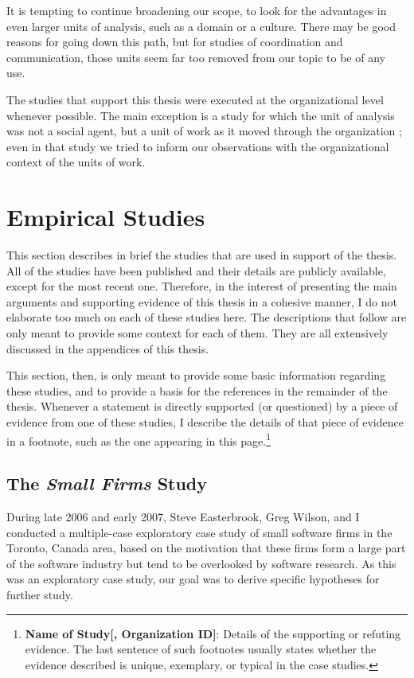 It is tempting to continue broadening our scope, to look for the advantages in even larger units of analysis, such as a domain or a culture. There may be good reasons for going down this path, but for studies of coordination and communication, those units seem far too removed from our topic to be of any use.

The studies that support this thesis were executed at the organizational level whenever possible. The main exception is a study for which the unit of analysis was not a social agent, but a unit of work as it moved through the organization \cite{Aranda2009}; even in that study we tried to inform our observations with the organizational context of the units of work.


\section{Empirical Studies}

This section describes in brief the studies that are used in support of the thesis. All of the studies have been published and their details are publicly available, except for the most recent one. Therefore, in the interest of presenting the main arguments and supporting evidence of this thesis in a cohesive manner, I do not elaborate too much on each of these studies here. The descriptions that follow are only meant to provide some context for each of them. They are all extensively discussed in the appendices of this thesis.

This section, then, is only meant to provide some basic information regarding these studies, and to provide a basis for the references in the remainder of the thesis. Whenever a statement is directly supported (or questioned) by a piece of evidence from one of these studies, I describe the details of that piece of evidence in a footnote, such as the one appearing in this page.\footnote{\textbf{Name of Study[, Organization ID]}: Details of the supporting or refuting evidence. The last sentence of such footnotes usually states whether the evidence described is unique, exemplary, or typical in the case studies.}


\subsection{The \emph{Small Firms} Study}
\label{sec:SmallFirmsStudy}

During late 2006 and early 2007, Steve Easterbrook, Greg Wilson, and I conducted a multiple-case exploratory case study of small software firms in the Toronto, Canada area, based on the motivation that these firms form a large part of the software industry but tend to be overlooked by software research. As this was an exploratory case study, our goal was to derive specific hypotheses for further study.


